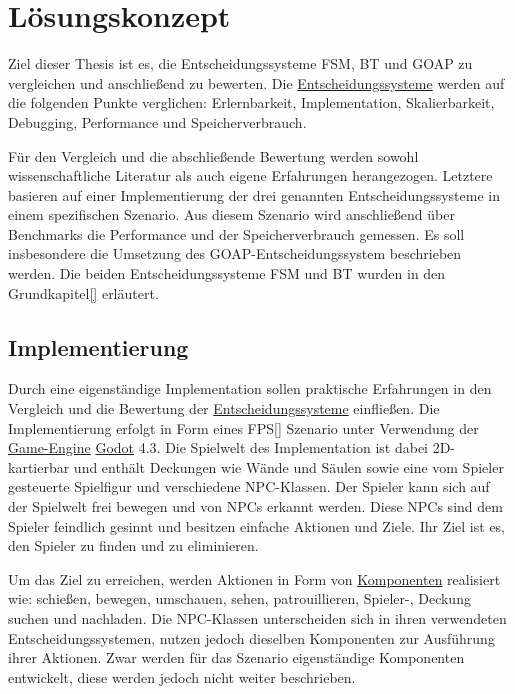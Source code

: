 \chapter{L\"{o}sungskonzept}
\label{chap:loesungskonzept}

Ziel dieser Thesis ist es, die Entscheidungssysteme FSM, BT und GOAP zu vergleichen und anschlie\ss{}end zu bewerten. Die \hyperref[chap:entscheidungssysteme]{Entscheidungssysteme} werden auf die folgenden Punkte verglichen: Erlernbarkeit, Implementation, Skalierbarkeit, Debugging, Performance und Speicherverbrauch.

F\"{u}r den Vergleich und die abschlie\ss{}ende Bewertung werden sowohl wissenschaftliche Literatur als auch eigene Erfahrungen herangezogen. Letztere basieren auf einer Implementierung der drei genannten Entscheidungssysteme in einem spezifischen Szenario. Aus diesem Szenario wird anschlie\ss{}end \"{u}ber Benchmarks die Performance und der Speicherverbrauch gemessen. Es soll insbesondere die Umsetzung des GOAP-Entscheidungssystem beschrieben werden. Die beiden Entscheidungssysteme FSM und BT wurden in den Grundkapitel\ref{} erl\"{a}utert.

\section{Implementierung}
\label{chap:lk implementierung}

Durch eine eigenst\"{a}ndige Implementation sollen praktische Erfahrungen in den Vergleich und die Bewertung der \hyperref[chap:entscheidungssysteme]{Entscheidungssysteme} einflie\ss{}en. Die Implementierung erfolgt in Form eines FPS\ref{} Szenario unter Verwendung der \hyperref[chap:game engines]{Game-Engine} \hyperref[chap:godot]{Godot} 4.3. Die Spielwelt des Implementation ist dabei 2D-kartierbar und enth\"{a}lt Deckungen wie W\"{a}nde und S\"{a}ulen sowie eine vom Spieler gesteuerte Spielfigur und verschiedene NPC-Klassen. Der Spieler kann sich auf der Spielwelt frei bewegen und von NPCs erkannt werden. Diese NPCs sind dem Spieler feindlich gesinnt und besitzen einfache Aktionen und Ziele. Ihr Ziel ist es, den Spieler zu finden und zu eliminieren.

Um das Ziel zu erreichen, werden Aktionen in Form von \hyperref[chap:game-objects]{Komponenten} realisiert wie: schie\ss{}en, bewegen, umschauen, sehen, patrouillieren, Spieler-, Deckung suchen und nachladen. Die NPC-Klassen unterscheiden sich in ihren verwendeten Entscheidungssystemen, nutzen jedoch dieselben Komponenten zur Ausf\"{u}hrung ihrer Aktionen. Zwar werden f\"{u}r das Szenario eigenst\"{a}ndige Komponenten entwickelt, diese werden jedoch nicht weiter beschrieben.

